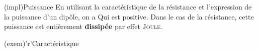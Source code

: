 \documentclass[../../main/main.tex]{subfiles}
\begin{document}
\begin{tcbraster}[raster columns=2, raster equal height=rows]
	\begin{tcb}[label=impl:resistance](impl){Puissance}
		En utilisant la caractéristique de la résistance et l'expression de la
		puissance d'un dipôle, on a
		\psw{
			\[
				\boxed{P_{\text{reçue}} = RI^2 = \frac{U^2}{R} = GU^2}
			\]
		}
		Qui est positive. Dans le cas de la résistance, cette puissance est
		entièrement \textbf{dissipée} par effet \textsc{Joule}.
		\begin{center}
		\end{center}
	\end{tcb}
	\begin{tcb}[label=exem:resistance](exem)'r'{Caractéristique}
		\begin{center}
\end{center}
\end{tcb}
\end{tcbraster}
\end{document}
